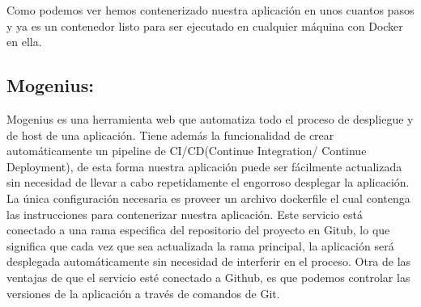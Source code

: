Como podemos ver hemos contenerizado nuestra aplicación en unos cuantos pasos y ya es un contenedor listo para ser ejecutado en cualquier máquina con Docker en ella.

\subsection{Mogenius:}

Mogenius es una herramienta web que automatiza todo el proceso de despliegue y de host de una aplicación. Tiene además la funcionalidad de crear automáticamente un pipeline de CI/CD(Continue Integration/ Continue Deployment), de esta forma nuestra aplicación puede ser fácilmente actualizada sin necesidad de llevar a cabo repetidamente el engorroso desplegar la aplicación. La única configuración necesaria es proveer un archivo dockerfile el cual contenga las instrucciones para contenerizar nuestra aplicación. Este servicio está conectado a una rama especifica del repositorio del proyecto en Gitub, lo que significa que cada vez que sea actualizada la rama principal, la aplicación será desplegada automáticamente sin necesidad de interferir en el proceso. Otra de las ventajas de que el servicio esté conectado a Github, es que podemos controlar las versiones de la aplicación a través de comandos de Git.